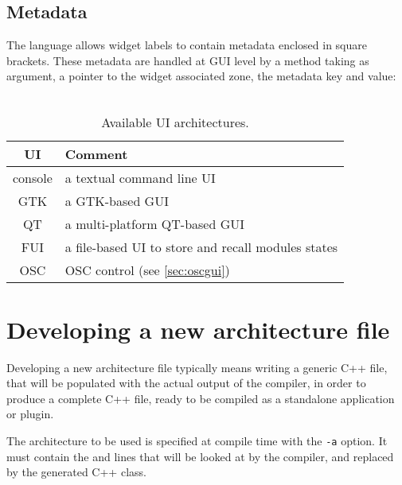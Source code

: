 \subsection{Metadata}
\label{sec:metadata}
The \faust language allows widget labels to contain metadata enclosed in square brackets. These metadata are handled at GUI level by a  method taking as argument, a pointer to the widget associated zone, the metadata key and value: \\
\htab{} \\


\begin{table}[htp]
\begin{center}
\begin{tabular}{|c|l|}
\hline
\bf{UI} & \bf{Comment} \\
\hline
console  & a textual command line UI \\
GTK  & a GTK-based GUI \\
QT   & a multi-platform QT-based GUI \\
FUI  & a file-based UI to store and recall modules states \\
OSC  & OSC control (see \ref{sec:oscgui}) \\
\hline
\end{tabular}
\end{center}
\caption{Available UI architectures.}
\label{tab:uiarch}
\end{table}%

\section{Developing a new architecture file}
\label{sec:architecture}

Developing a new architecture file typically means writing a generic C++ file, that will be populated with the actual output of the \faust compiler, in order to produce a complete C++ file, ready to be compiled as a standalone application or plugin. 

The architecture to be used is specified at compile time with the \lstinline'-a' option. It must contain the  and  lines that will be looked at by the \faust compiler, and replaced by the generated C++ class. 

